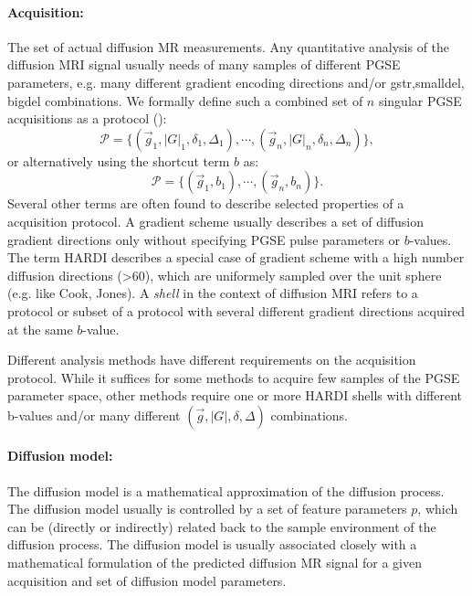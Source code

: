 \paragraph{Acquisition:} The set of actual diffusion MR measurements. Any quantitative analysis of the diffusion MRI signal usually needs of many samples of different PGSE parameters, e.g. many different gradient encoding directions and/or \gls{gstr},\gls{smalldel}, \gls{bigdel} combinations. We formally define such a combined set of $n$ singular PGSE acquisitions as a protocol (\prot):
\begin{equation}
	\mathcal{P} = \{(\vec{g}_1,|G|_1,\delta_1,\Delta_1),\cdots,(\vec{g}_n,|G|_n,\delta_n,\Delta_n)\},
\end{equation}
or alternatively using the shortcut term $b$ as:
\begin{equation*}		
	\mathcal{P} = \{(\vec{g}_1,b_1),\cdots,(\vec{g}_n,b_n)\}.
\end{equation*}
Several other terms are often found to describe selected properties of a acquisition protocol. A gradient scheme usually describes a set of diffusion gradient directions only without specifying PGSE pulse parameters or $b$-values. The term \gls{HARDI} describes a special case of gradient scheme with a high number diffusion directions (>60), which are uniformely sampled over the unit sphere (e.g. like Cook, Jones). A \textit{shell} in the context of diffusion MRI refers to a protocol or subset of a protocol with several different gradient directions acquired at the same $b$-value. 



Different analysis methods have different requirements on the acquisition protocol. While it suffices for some methods to acquire few samples of the PGSE parameter space, other methods require one or more HARDI shells with different b-values and/or many different $(\vec{g},|G|,\delta,\Delta)$ combinations.  


\paragraph{Diffusion model:} The diffusion model is a mathematical approximation of the diffusion process. The diffusion model usually is controlled by a set of feature parameters $p$, which can be (directly or indirectly) related back to the sample environment of the diffusion process. The diffusion model is usually associated closely with a mathematical formulation of the predicted diffusion MR signal for a given acquisition and set of diffusion model parameters.
